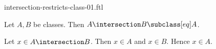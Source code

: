\documentclass{article}
\begin{document}
\begin{smodule}[creators={Marcel Schütz}]{intersection-restricts-class-01.ftl}

  \begin{fproposition*}[label=8287827479494656]
    Let $A, B$ be classes.
    Then $A \intersection B \subclass[eq] A$.
  \end{fproposition*}
  \begin{fproof}
    Let $x \in A \intersection B$.
    Then $x \in A$ and $x \in B$.
    Hence $x \in A$.
  \end{fproof}
\end{smodule}
\end{document}
